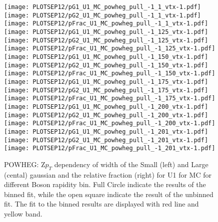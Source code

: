 \documentclass[41pt,a4paper,oneside]{report}
\begin{document}
\begin{figure}[h!]
  \begin{center}
    \texttt{[image: PLOTSEP12/pG1\_U1\_MC\_powheg\_pull\_-1\_1\_vtx-1.pdf]}
    \texttt{[image: PLOTSEP12/pG2\_U1\_MC\_powheg\_pull\_-1\_1\_vtx-1.pdf]}
    \texttt{[image: PLOTSEP12/pFrac\_U1\_MC\_powheg\_pull\_-1\_1\_vtx-1.pdf]} 
    \texttt{[image: PLOTSEP12/pG1\_U1\_MC\_powheg\_pull\_-1\_125\_vtx-1.pdf]}
    \texttt{[image: PLOTSEP12/pG2\_U1\_MC\_powheg\_pull\_-1\_125\_vtx-1.pdf]}
    \texttt{[image: PLOTSEP12/pFrac\_U1\_MC\_powheg\_pull\_-1\_125\_vtx-1.pdf]} 
    \texttt{[image: PLOTSEP12/pG1\_U1\_MC\_powheg\_pull\_-1\_150\_vtx-1.pdf]}
    \texttt{[image: PLOTSEP12/pG2\_U1\_MC\_powheg\_pull\_-1\_150\_vtx-1.pdf]}
    \texttt{[image: PLOTSEP12/pFrac\_U1\_MC\_powheg\_pull\_-1\_150\_vtx-1.pdf]} 
    \texttt{[image: PLOTSEP12/pG1\_U1\_MC\_powheg\_pull\_-1\_175\_vtx-1.pdf]}
    \texttt{[image: PLOTSEP12/pG2\_U1\_MC\_powheg\_pull\_-1\_175\_vtx-1.pdf]}
    \texttt{[image: PLOTSEP12/pFrac\_U1\_MC\_powheg\_pull\_-1\_175\_vtx-1.pdf]} 
    \texttt{[image: PLOTSEP12/pG1\_U1\_MC\_powheg\_pull\_-1\_200\_vtx-1.pdf]}
    \texttt{[image: PLOTSEP12/pG2\_U1\_MC\_powheg\_pull\_-1\_200\_vtx-1.pdf]}
    \texttt{[image: PLOTSEP12/pFrac\_U1\_MC\_powheg\_pull\_-1\_200\_vtx-1.pdf]} 
    \texttt{[image: PLOTSEP12/pG1\_U1\_MC\_powheg\_pull\_-1\_201\_vtx-1.pdf]}
    \texttt{[image: PLOTSEP12/pG2\_U1\_MC\_powheg\_pull\_-1\_201\_vtx-1.pdf]}
    \texttt{[image: PLOTSEP12/pFrac\_U1\_MC\_powheg\_pull\_-1\_201\_vtx-1.pdf]} 
    \caption{POWHEG: Z$p_{T}$ dependency of width of the Small (left) and Large (cental) gaussian and the relative fraction (right) for U1 for MC for different Boson rapidity bin. Full Circle indicate the results of the binned fit, while the open square indicate the result of the unbinned fit. The fit to the binned results are displayed with red line and yellow band.
\newline
}
    \label{fig:SmallLargeU1POW}
  \end{center}
\end{figure}
\end{document}

